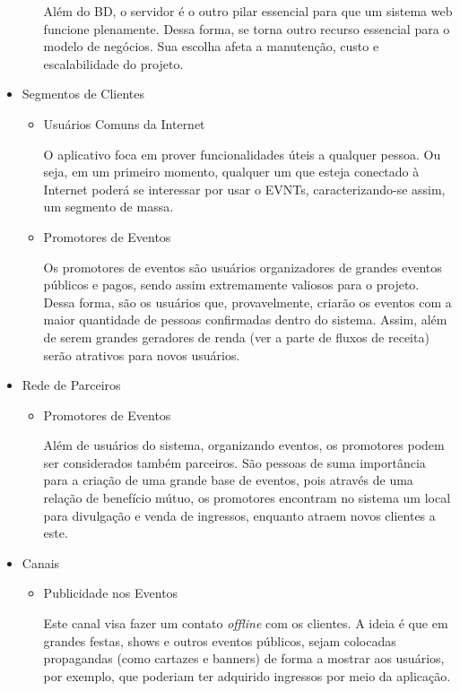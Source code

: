 \begin{itemize}
\begin{itemize}
Além do BD, o servidor é o outro pilar essencial para que um sistema web funcione plenamente. Dessa forma, se torna outro recurso essencial para o modelo de negócios. Sua escolha afeta a manutenção, custo e escalabilidade do projeto.
\end{itemize}

\item{Segmentos de Clientes}

\begin{itemize}
\item Usuários Comuns da Internet

O aplicativo foca em prover funcionalidades úteis a qualquer pessoa. Ou seja, em um primeiro momento, qualquer um que esteja conectado à Internet poderá se interessar por usar o EVNTs, caracterizando-se assim, um segmento de massa.

\item Promotores de Eventos

Os promotores de eventos são usuários organizadores de grandes eventos públicos e pagos, sendo assim extremamente valiosos para o projeto. Dessa forma, são os usuários que, provavelmente, criarão os eventos com a maior quantidade de pessoas confirmadas dentro do sistema. Assim, além de serem grandes geradores de renda (ver a parte de fluxos de receita) serão atrativos para novos usuários.
\end{itemize}

\item{Rede de Parceiros}

\begin{itemize}
\item Promotores de Eventos

Além de usuários do sistema, organizando eventos, os promotores podem ser considerados também parceiros. São pessoas de suma importância para a criação de uma grande base de eventos, pois através de uma relação de benefício mútuo, os promotores encontram no sistema um local para divulgação e venda de ingressos, enquanto atraem novos clientes a este.
\end{itemize}

\item{Canais}

\begin{itemize}
\item Publicidade nos Eventos

Este canal visa fazer um contato \textit{offline} com os clientes. A ideia é que em grandes festas, shows e outros eventos públicos, sejam colocadas propagandas (como cartazes e banners) de forma a mostrar aos usuários, por exemplo, que poderiam ter adquirido ingressos por meio da aplicação.


\end{itemize}
\end{itemize}
